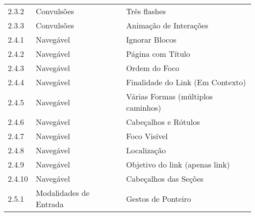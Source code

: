 \begin{table}[]
\begin{tabular}{lll}
 2.3.2           & Convulsões             & Três flashes                                                                        \\
 
 2.3.3           & Convulsões             & Animação de Interações                                                              \\
 
 2.4.1           & Navegável              & Ignorar Blocos                                                                       \\
 
 2.4.2           & Navegável              & Página com Título                                                                    \\
 
 2.4.3           & Navegável              & Ordem do Foco                                                                        \\
 
 2.4.4           & Navegável              & Finalidade do Link (Em Contexto)                                                     \\
 
 2.4.5           & Navegável              & Várias Formas (múltiplos caminhos)                                                  \\
 
 2.4.6           & Navegável              & Cabeçalhos e Rótulos                                                                \\
 
 2.4.7           & Navegável              & Foco Visível                                                                        \\
 
 2.4.8           & Navegável              & Localização                                                                         \\
 
 2.4.9           & Navegável              & Objetivo do link (apenas link)                                                      \\
 
 2.4.10          & Navegável              & Cabeçalhos das Seções                                                               \\
 
 2.5.1           & Modalidades de Entrada & Gestos de Ponteiro                                                                   \\
 

\end{tabular}
\end{table}
